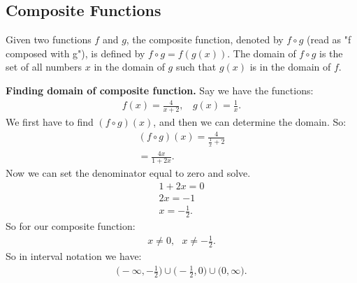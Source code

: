 \documentclass{report}
\begin{document}
    \subsection{Composite Functions}
    \smallbreak \noindent
    \begin{definition}
      \bigbreak \noindent 
      Given two functions $f$ and $g$, the composite function, denoted by $f \circ g$ (read as "f composed with g"), is defined by $f \circ g = f(g(x))$.
      \bigbreak \noindent 
      The domain of $f \circ g$ is the set of all numbers $x$ in the domain of $g$ such that $g(x)$ is in the domain of $f$.
    \end{definition}
    \bigbreak \noindent 
    \begin{mdframed}
      \textbf{Finding domain of composite function.}
      \bigbreak \noindent 
      Say we have the functions:
      \begin{align*}
        f(x) = \frac{4}{x+2}, \ \ \ \ g(x) = \frac{1}{x}
      .\end{align*}
      \bigbreak \noindent 
      We first have to find $(f \circ g)(x)$, and then we can determine the domain.
      \bigbreak \noindent 
      So:
      \begin{align*}
        (f \circ g)(x) = \frac{4}{\frac{1}{x}+2} \\
        = \frac{4x}{1+2x}
      .\end{align*}
      \bigbreak \noindent 
      Now we can set the denominator equal to zero and solve.
      \begin{align*}
        1+2x = 0 \\
        2x = -1 \\
        x = -\frac{1}{2}
      .\end{align*}
      \bigbreak \noindent 
      So for our composite function:
      \begin{align*}
        x \neq 0, \ \ \ x \neq -\frac{1}{2}
      .\end{align*}
      \bigbreak \noindent \bigbreak \noindent 
      \bigbreak \noindent 
      So in interval notation we have:
      \begin{align*}
        \bigg(-\infty, -\frac{1}{2}\bigg)\cup \bigg(-\frac{1}{2}, 0 \bigg)\cup \bigg(0,\infty\bigg)
      .\end{align*}
    \end{mdframed}

    \pagebreak \bigbreak \noindent 
\end{document}
